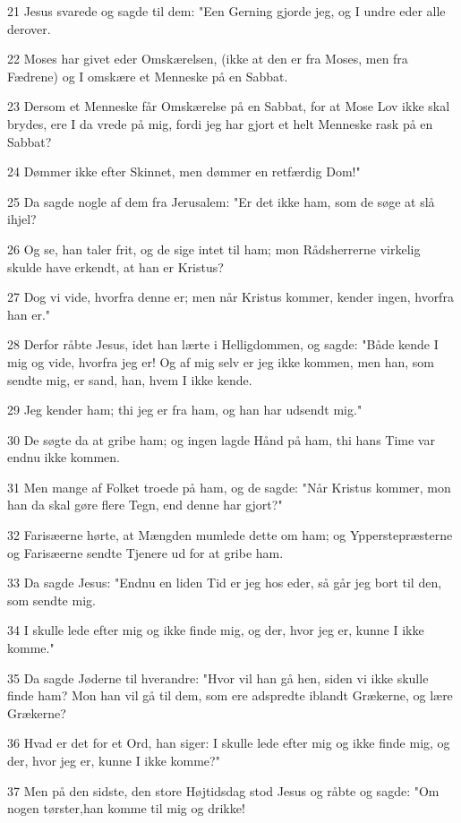 \par 21 Jesus svarede og sagde til dem: "Een Gerning gjorde jeg, og I undre eder alle derover.
\par 22 Moses har givet eder Omskærelsen, (ikke at den er fra Moses, men fra Fædrene) og I omskære et Menneske på en Sabbat.
\par 23 Dersom et Menneske får Omskærelse på en Sabbat, for at Mose Lov ikke skal brydes, ere I da vrede på mig, fordi jeg har gjort et helt Menneske rask på en Sabbat?
\par 24 Dømmer ikke efter Skinnet, men dømmer en retfærdig Dom!"
\par 25 Da sagde nogle af dem fra Jerusalem: "Er det ikke ham, som de søge at slå ihjel?
\par 26 Og se, han taler frit, og de sige intet til ham; mon Rådsherrerne virkelig skulde have erkendt, at han er Kristus?
\par 27 Dog vi vide, hvorfra denne er; men når Kristus kommer, kender ingen, hvorfra han er."
\par 28 Derfor råbte Jesus, idet han lærte i Helligdommen, og sagde: "Både kende I mig og vide, hvorfra jeg er! Og af mig selv er jeg ikke kommen, men han, som sendte mig, er sand, han, hvem I ikke kende.
\par 29 Jeg kender ham; thi jeg er fra ham, og han har udsendt mig."
\par 30 De søgte da at gribe ham; og ingen lagde Hånd på ham, thi hans Time var endnu ikke kommen.
\par 31 Men mange af Folket troede på ham, og de sagde: "Når Kristus kommer, mon han da skal gøre flere Tegn, end denne har gjort?"
\par 32 Farisæerne hørte, at Mængden mumlede dette om ham; og Ypperstepræsterne og Farisæerne sendte Tjenere ud for at gribe ham.
\par 33 Da sagde Jesus: "Endnu en liden Tid er jeg hos eder, så går jeg bort til den, som sendte mig.
\par 34 I skulle lede efter mig og ikke finde mig, og der, hvor jeg er, kunne I ikke komme."
\par 35 Da sagde Jøderne til hverandre: "Hvor vil han gå hen, siden vi ikke skulle finde ham? Mon han vil gå til dem, som ere adspredte iblandt Grækerne, og lære Grækerne?
\par 36 Hvad er det for et Ord, han siger: I skulle lede efter mig og ikke finde mig, og der, hvor jeg er, kunne I ikke komme?"
\par 37 Men på den sidste, den store Højtidsdag stod Jesus og råbte og sagde: "Om nogen tørster,han komme til mig og drikke!
